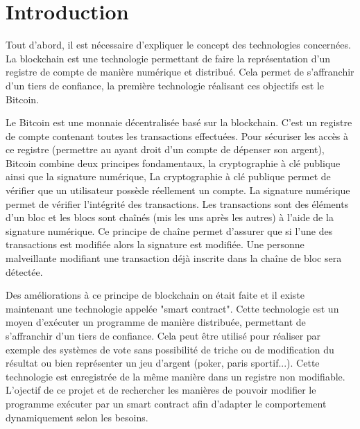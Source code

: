 \section{Introduction}

Tout d’abord, il est nécessaire d’expliquer le concept des technologies concernées. La
blockchain est une technologie permettant de faire la représentation d’un registre de compte de
manière numérique et distribué. Cela permet de s’affranchir d’un tiers de confiance, la première
technologie réalisant ces objectifs est le Bitcoin. 

Le Bitcoin est une monnaie décentralisée basé sur
la blockchain. C'est un registre de compte contenant toutes les transactions effectuées. Pour sécuriser
les accès à ce registre (permettre au ayant droit d’un compte de dépenser son argent), Bitcoin
combine deux principes fondamentaux, la cryptographie à clé publique ainsi que la signature
numérique, La cryptographie à clé publique permet de vérifier que un utilisateur possède réellement
un compte. La signature numérique permet de vérifier l’intégrité des transactions. Les transactions
sont des éléments d’un bloc et les blocs sont chaînés (mis les uns après les autres) à l’aide de la
signature numérique. Ce principe de chaîne permet d’assurer que si l’une des transactions est
modifiée alors la signature est modifiée. Une personne malveillante modifiant une transaction déjà
inscrite dans la chaîne de bloc sera détectée.

Des améliorations à ce principe de blockchain on était faite et il existe maintenant une
technologie appelée "smart contract". Cette technologie est un moyen d’exécuter un programme
de manière distribuée, permettant de s’affranchir d’un tiers de confiance. Cela peut être utilisé pour
réaliser par exemple des systèmes de vote sans possibilité de triche ou de modification du résultat
ou bien représenter un jeu d’argent (poker, paris sportif...). Cette technologie est enregistrée de la
même manière dans un registre non modifiable. L’ojectif de ce projet et de rechercher les manières
de pouvoir modifier le programme exécuter par un smart contract afin d’adapter le comportement
dynamiquement selon les besoins.
